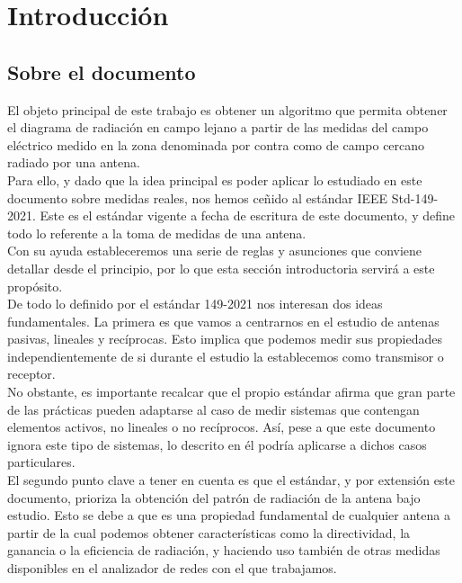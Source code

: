 
\chapter{Introducción}
\label{cha:introduccion}

\section{Sobre el documento} 

El objeto principal de este trabajo es obtener un algoritmo que permita obtener
el diagrama de radiación en campo lejano a partir de las medidas del campo
eléctrico medido en la zona denominada por contra como de campo cercano
radiado por una antena.
\\

Para ello, y dado que la idea principal es poder aplicar lo estudiado en este documento sobre medidas reales, nos hemos ceñido al estándar IEEE Std-149-2021. Este es el estándar vigente a fecha de escritura de este
documento, y define todo lo referente a la toma de medidas de una antena.\\
Con su ayuda estableceremos una serie de reglas y asunciones que conviene detallar desde el principio, por lo que esta sección introductoria servirá a este propósito.
\\

De todo lo definido por el estándar 149-2021 \autocite{IEEEstd} nos interesan dos ideas fundamentales. La primera es que vamos a centrarnos en el estudio de antenas pasivas, lineales y recíprocas. Esto implica que podemos medir sus propiedades independientemente de si durante el estudio la establecemos como transmisor o receptor.
\\

No obstante, es importante recalcar que el propio estándar afirma que gran parte de las prácticas pueden adaptarse al caso de medir sistemas que contengan elementos activos, no lineales o no recíprocos. Así, pese a que este documento ignora este tipo de sistemas, lo descrito en él podría aplicarse a dichos casos particulares.
\\
El segundo punto clave a tener en cuenta es que el estándar, y por extensión este documento, prioriza la obtención del patrón de radiación de la antena bajo estudio. Esto se debe a que es una propiedad fundamental de cualquier antena a partir de la cual podemos obtener características como la directividad, la ganancia o la eficiencia de radiación, y haciendo uso también de otras medidas disponibles en el analizador de redes con el que trabajamos.
\\
\newpage
